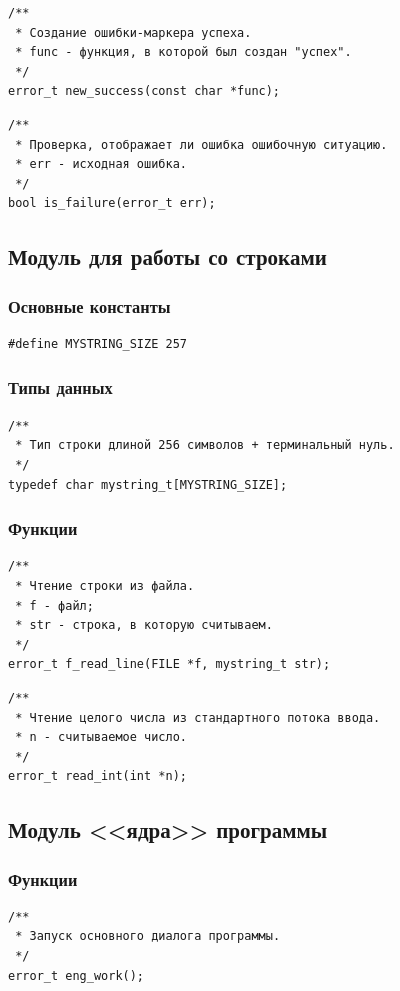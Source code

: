 \documentclass[a4paper,12pt]{extarticle}
\begin{document}
\begin{verbatim}
/**
 * Создание ошибки-маркера успеха.
 * func - функция, в которой был создан "успех".
 */
error_t new_success(const char *func);
\end{verbatim}



\begin{verbatim}
/**
 * Проверка, отображает ли ошибка ошибочную ситуацию.
 * err - исходная ошибка.
 */
bool is_failure(error_t err);
\end{verbatim}


\subsection{Модуль для работы со строками}
\subsubsection{Основные константы}
\begin{verbatim}
#define MYSTRING_SIZE 257
\end{verbatim}


\subsubsection{Типы данных}
\begin{verbatim}
/**
 * Тип строки длиной 256 символов + терминальный нуль.
 */
typedef char mystring_t[MYSTRING_SIZE];
\end{verbatim}

\subsubsection{Функции}
\begin{verbatim}
/**
 * Чтение строки из файла.
 * f - файл;
 * str - строка, в которую считываем.
 */
error_t f_read_line(FILE *f, mystring_t str);
\end{verbatim}

\begin{verbatim}
/**
 * Чтение целого числа из стандартного потока ввода.
 * n - считываемое число.
 */
error_t read_int(int *n);
\end{verbatim}

\subsection{Модуль <<ядра>> программы}
\subsubsection{Функции}
\begin{verbatim}
/**
 * Запуск основного диалога программы.
 */
error_t eng_work();
\end{verbatim}
\end{document}
